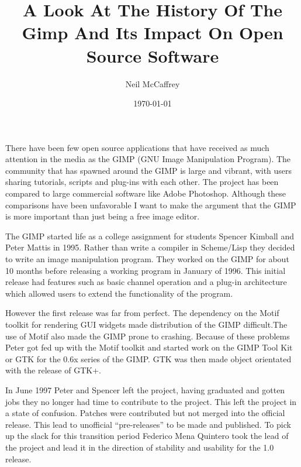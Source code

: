\documentclass[a4 paper, 12pt]{article}
\begin{document}
\author{Neil McCaffrey}
\title{A Look At The History Of The Gimp And Its Impact On Open Source
Software}
\date{\today}
\maketitle


	There have been few open source applications that have received as much
	attention in the media as the GIMP (GNU Image Manipulation Program). The
	community that has spawned around the GIMP is large and vibrant, with users
	sharing tutorials, scripts and plug-ins with each other. The project has been
	compared to large commercial software like Adobe Photoshop.  Although these
	comparisons have been unfavorable I want to make the argument that the GIMP
	is more important than just being a free image editor.

	The GIMP started life as a college assignment for students Spencer Kimball
	and Peter Mattis in 1995. Rather than write a compiler in Scheme/Lisp they
	decided to write an image manipulation program. They worked on the GIMP for
	about 10 months before releasing a working program in January of 1996. This
	initial release had features such as basic channel operation and a plug-in
	architecture which allowed users to extend the functionality of the
	program.

	However the first release was far from perfect. The dependency on the Motif
	toolkit for rendering GUI widgets made distribution of the GIMP
	difficult.The use of Motif also made the GIMP prone to crashing.  Because
	of these problems Peter got fed up with the Motif toolkit and started work
	on the GIMP Tool Kit or GTK for the 0.6x series of the GIMP.  GTK was then
	made object orientated with the release of GTK+.

	In June 1997 Peter and Spencer left the project, having graduated and gotten
	jobs they no longer had time to contribute to the project. This left the
	project in a state of confusion. Patches were contributed but not merged
	into the official release. This lead to unofficial ``pre-releases'' to be
	made and published. To pick up the slack for this transition period Federico
	Mena Quintero took the lead of the project and lead it in the direction of
	stability and usability for the 1.0 release.
\end{document}
